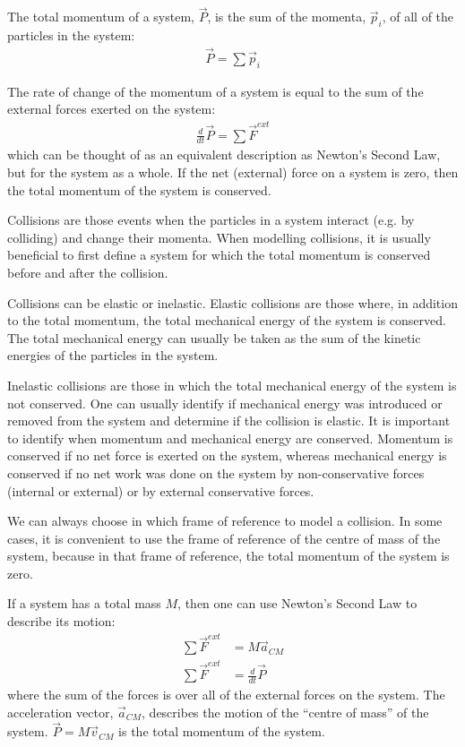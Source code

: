 \begin{chapterSummary}
{The total momentum of a system, $\vec P$, is the sum of the momenta, $\vec p_i$, of all of the particles in the system:
\begin{align*}
\vec P = \sum \vec p_i
\end{align*}

The rate of change of the momentum of a system is equal to the sum of the external forces exerted on the system:
\begin{align*}
\frac{d}{dt}\vec P = \sum \vec F^{ext}
\end{align*}
which can be thought of as an equivalent description as Newton's Second Law, but for the system as a whole. If the net (external) force on a system is zero, then the total momentum of the system is conserved. 

Collisions are those events when the particles in a system interact (e.g. by colliding) and change their momenta. When modelling collisions, it is usually beneficial to first define a system for which the total momentum is conserved before and after the collision. 

Collisions can be elastic or inelastic. Elastic collisions are those where, in addition to the total momentum, the total mechanical energy of the system is conserved. The total mechanical energy can usually be taken as the sum of the kinetic energies of the particles in the system.

Inelastic collisions are those in which the total mechanical energy of the system is not conserved. One can usually identify if mechanical energy was introduced or removed from the system and determine if the collision is elastic. It is important to identify when momentum and mechanical energy are conserved. Momentum is conserved if no net force is exerted on the system, whereas mechanical energy is conserved if no net work was done on the system by non-conservative forces (internal or external) or by external conservative forces.

We can always choose in which frame of reference to model a collision. In some cases, it is convenient to use the frame of reference of the centre of mass of the system, because in that frame of reference, the total momentum of the system is zero.

If a system has a total mass $M$, then one can use Newton's Second Law to describe its motion:
\begin{align*}
\sum \vec F^{ext} &= M \vec a_{CM}\\
\sum \vec F^{ext} &=\frac{d}{dt} \vec P
\end{align*}
where the sum of the forces is over all of the external forces on the system. The acceleration vector, $\vec a_{CM}$, describes the motion of the ``centre of mass'' of the system. $\vec P=M\vec v_{CM}$ is the total momentum of the system.

}
\end{chapterSummary}
